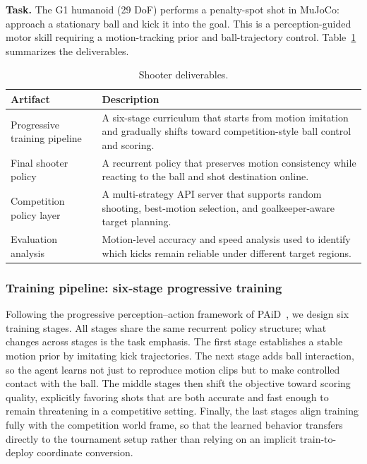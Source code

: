 \documentclass{article}
\begin{document}
\textbf{Task.} The G1 humanoid (29 DoF) performs a penalty-spot shot in MuJoCo:
approach a stationary ball and kick it into the goal. This is a
perception-guided motor skill requiring a motion-tracking prior and
ball-trajectory control. Table~\ref{tab:sh-deliverables} summarizes the
deliverables.

\begin{table}[h]
\centering\small
\caption{Shooter deliverables.}
\label{tab:sh-deliverables}
\begin{tabular}{@{}lp{9.5cm}@{}}
\toprule
Artifact & Description \\
\midrule
Progressive training pipeline & A six-stage curriculum that starts from motion imitation and gradually shifts toward competition-style ball control and scoring. \\
Final shooter policy & A recurrent policy that preserves motion consistency while reacting to the ball and shot destination online. \\
Competition policy layer & A multi-strategy API server that supports random shooting, best-motion selection, and goalkeeper-aware target planning. \\
Evaluation analysis & Motion-level accuracy and speed analysis used to identify which kicks remain reliable under different target regions. \\
\bottomrule
\end{tabular}
\end{table}

\subsubsection{Training pipeline: six-stage progressive training}\label{sec:sh-pipeline}

Following the progressive perception--action framework of PAiD~\cite{kong}, we
design six training stages. All stages share the same recurrent policy
structure; what changes across stages is the task emphasis. The first stage
establishes a stable motion prior by imitating kick trajectories. The next
stage adds ball interaction, so the agent learns not just to reproduce motion
clips but to make controlled contact with the ball. The middle stages then
shift the objective toward scoring quality, explicitly favoring shots that are
both accurate and fast enough to remain threatening in a competitive setting.
Finally, the last stages align training fully with the competition world frame,
so that the learned behavior transfers directly to the tournament setup rather
than relying on an implicit train-to-deploy coordinate conversion.
\end{document}
